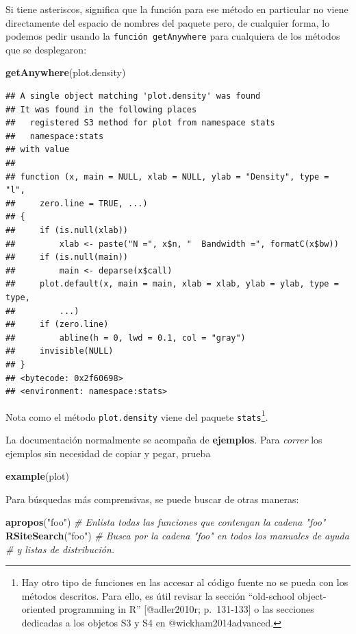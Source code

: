 \documentclass[]{article}
\newenvironment{Shaded}{\begin{snugshade}}{\end{snugshade}}
\newcommand{\KeywordTok}[1]{\textcolor[rgb]{0.13,0.29,0.53}{\textbf{{#1}}}}
\newcommand{\StringTok}[1]{\textcolor[rgb]{0.31,0.60,0.02}{{#1}}}
\newcommand{\CommentTok}[1]{\textcolor[rgb]{0.56,0.35,0.01}{\textit{{#1}}}}
\newcommand{\NormalTok}[1]{{#1}}
\let\rmarkdownfootnote\footnote%
\def\footnote{\protect\rmarkdownfootnote}
\begin{document}
Si tiene asteriscos, significa que la función para ese método en
particular no viene directamente del espacio de nombres del paquete
pero, de cualquier forma, lo podemos pedir usando la
\texttt{función getAnywhere} para cualquiera de los métodos que se
desplegaron:

\begin{Shaded}
\begin{Highlighting}[]
\KeywordTok{getAnywhere}\NormalTok{(plot.density)}
\end{Highlighting}
\end{Shaded}

\begin{verbatim}
## A single object matching 'plot.density' was found
## It was found in the following places
##   registered S3 method for plot from namespace stats
##   namespace:stats
## with value
## 
## function (x, main = NULL, xlab = NULL, ylab = "Density", type = "l", 
##     zero.line = TRUE, ...) 
## {
##     if (is.null(xlab)) 
##         xlab <- paste("N =", x$n, "  Bandwidth =", formatC(x$bw))
##     if (is.null(main)) 
##         main <- deparse(x$call)
##     plot.default(x, main = main, xlab = xlab, ylab = ylab, type = type, 
##         ...)
##     if (zero.line) 
##         abline(h = 0, lwd = 0.1, col = "gray")
##     invisible(NULL)
## }
## <bytecode: 0x2f60698>
## <environment: namespace:stats>
\end{verbatim}

Nota como el método \texttt{plot.density} viene del paquete
\texttt{stats}\footnote{Hay otro tipo de funciones en las accesar al
  código fuente no se pueda con los métodos descritos. Para ello, es
  útil revisar la sección ``old-school object-oriented programming in
  R'' {[}@adler2010r; p.~131-133{]} o las secciones dedicadas a los
  objetos S3 y S4 en @wickham2014advanced.}.

La documentación normalmente se acompaña de \textbf{ejemplos}. Para
\emph{correr} los ejemplos sin necesidad de copiar y pegar, prueba

\begin{Shaded}
\begin{Highlighting}[]
\KeywordTok{example}\NormalTok{(plot)}
\end{Highlighting}
\end{Shaded}

Para búsquedas más comprensivas, se puede buscar de otras maneras:

\begin{Shaded}
\begin{Highlighting}[]
\KeywordTok{apropos}\NormalTok{(}\StringTok{"foo"}\NormalTok{) }\CommentTok{# Enlista todas las funciones que contengan la cadena "foo"}
\KeywordTok{RSiteSearch}\NormalTok{(}\StringTok{"foo"}\NormalTok{) }\CommentTok{# Busca por la cadena "foo" en todos los manuales de ayuda }
\CommentTok{# y listas de distribución.}
\end{Highlighting}
\end{Shaded}
\end{document}
